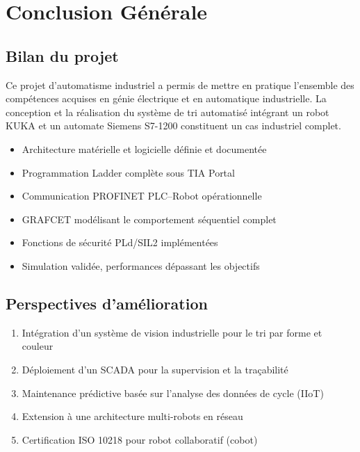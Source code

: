 \documentclass[12pt, a4paper]{report}
\newcommand{\kuka}{KUKA}
\newcommand{\profinet}{PROFINET}
\newcommand{\tia}{TIA Portal}
\newcommand{\siemens}{Siemens S7-1200}
\begin{document}
\chapter{Conclusion G\'en\'erale}

\section{Bilan du projet}

Ce projet d'automatisme industriel a permis de mettre en pratique l'ensemble des
comp\'etences acquises en g\'enie \'electrique et en automatique industrielle. La conception
et la r\'ealisation du syst\`eme de tri automatis\'e int\'egrant un robot \kuka{} et un
automate \siemens{} constituent un cas industriel complet.

\begin{itemize}[itemsep=4pt]
  \item[$\checkmark$] Architecture mat\'erielle et logicielle d\'efinie et document\'ee
  \item[$\checkmark$] Programmation Ladder compl\`ete sous \tia{}
  \item[$\checkmark$] Communication \profinet{} PLC--Robot op\'erationnelle
  \item[$\checkmark$] GRAFCET mod\'elisant le comportement s\'equentiel complet
  \item[$\checkmark$] Fonctions de s\'ecurit\'e PLd/SIL2 impl\'ement\'ees
  \item[$\checkmark$] Simulation valid\'ee, performances d\'epassant les objectifs
\end{itemize}

\section{Perspectives d'am\'elioration}

\begin{enumerate}[label=\textbf{\arabic*.}, itemsep=4pt]
  \item Int\'egration d'un syst\`eme de vision industrielle pour le tri par forme et couleur
  \item D\'eploiement d'un SCADA pour la supervision et la tra\c{c}abilit\'e
  \item Maintenance pr\'edictive bas\'ee sur l'analyse des donn\'ees de cycle (IIoT)
  \item Extension \`a une architecture multi-robots en r\'eseau
  \item Certification ISO 10218 pour robot collaboratif (cobot)
\end{enumerate}
\end{document}
